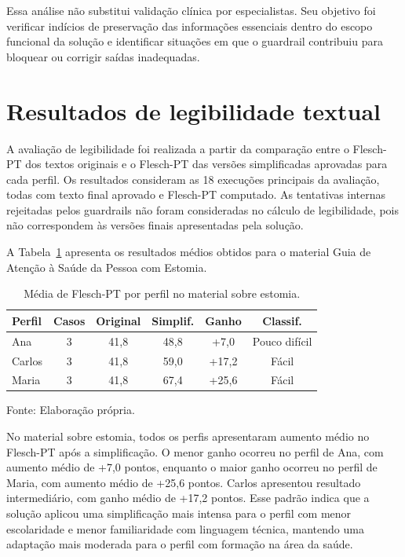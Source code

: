 Essa análise não substitui validação clínica por especialistas. Seu objetivo foi verificar indícios de preservação das informações essenciais dentro do escopo funcional da solução e identificar situações em que o guardrail contribuiu para bloquear ou corrigir saídas inadequadas.

\section{Resultados de legibilidade textual}
\label{sec:resultados-legibilidade-textual}

A avaliação de legibilidade foi realizada a partir da comparação entre o Flesch-PT dos textos originais e o Flesch-PT das versões simplificadas aprovadas para cada perfil. Os resultados consideram as 18 execuções principais da avaliação, todas com texto final aprovado e Flesch-PT computado. As tentativas internas rejeitadas pelos guardrails não foram consideradas no cálculo de legibilidade, pois não correspondem às versões finais apresentadas pela solução.

A Tabela~\ref{tab:flesch-estomia} apresenta os resultados médios obtidos para o material Guia de Atenção à Saúde da Pessoa com Estomia.

\begin{table}[htbp]
  \centering
  \caption{Média de Flesch-PT por perfil no material sobre estomia.}
  \label{tab:flesch-estomia}
  \small
  \renewcommand{\arraystretch}{1.15}
  \begin{tabular}{lccccc}
    \hline
    \textbf{Perfil} & \textbf{Casos} & \textbf{Original} & \textbf{Simplif.} & \textbf{Ganho} & \textbf{Classif.} \\
    \hline
    Ana    & 3 & 41,8 & 48,8 & +7,0  & Pouco difícil \\
    Carlos & 3 & 41,8 & 59,0 & +17,2 & Fácil \\
    Maria  & 3 & 41,8 & 67,4 & +25,6 & Fácil \\
    \hline
  \end{tabular}

  {\footnotesize Fonte: Elaboração própria.}
\end{table}

No material sobre estomia, todos os perfis apresentaram aumento médio no Flesch-PT após a simplificação. O menor ganho ocorreu no perfil de Ana, com aumento médio de +7,0 pontos, enquanto o maior ganho ocorreu no perfil de Maria, com aumento médio de +25,6 pontos. Carlos apresentou resultado intermediário, com ganho médio de +17,2 pontos. Esse padrão indica que a solução aplicou uma simplificação mais intensa para o perfil com menor escolaridade e menor familiaridade com linguagem técnica, mantendo uma adaptação mais moderada para o perfil com formação na área da saúde.

